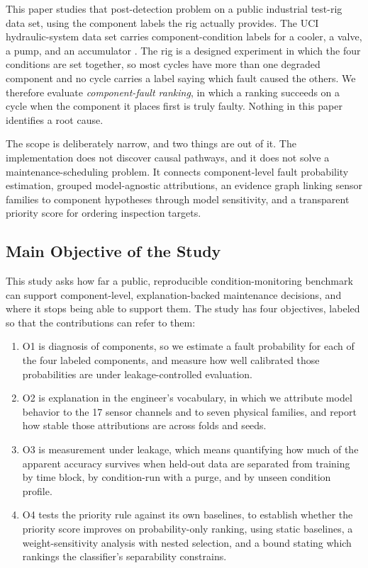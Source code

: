 \documentclass[journal]{IEEEtran}
\begin{document}
This paper studies that post-detection problem on a public industrial test-rig
data set, using the component labels the rig actually provides. The UCI
hydraulic-system data set carries component-condition labels for a cooler, a
valve, a pump, and an accumulator \cite{Helwig2015Hydraulic,Dua2019UCI}. The rig is
a designed experiment in which the four conditions are set together, so most
cycles have more than one degraded component and no cycle carries a label saying
which fault caused the others. We therefore evaluate \emph{component-fault
ranking}, in which a ranking succeeds on a cycle when the component it places first is
truly faulty. Nothing in this paper identifies a root cause.

The scope is deliberately narrow, and two things are out of it. The implementation
does not discover causal pathways, and it does not solve a maintenance-scheduling
problem. It connects component-level fault probability estimation, grouped
model-agnostic attributions, an evidence graph linking sensor families to component
hypotheses through model sensitivity, and a transparent priority score for ordering
inspection targets.

\subsection{Main Objective of the Study}
\label{sec:objective}

This study asks how far a public, reproducible condition-monitoring benchmark can
support component-level, explanation-backed maintenance decisions, and where it
stops being able to support them. The study has four objectives, labeled so that the
contributions can refer to them:
\begin{enumerate}
    \item O1 is diagnosis of components, so we estimate a fault probability for
    each of the four labeled components, and measure how well calibrated those
    probabilities are under leakage-controlled evaluation.
    \item O2 is explanation in the engineer's vocabulary, in which we attribute model behavior
    to the 17 sensor channels and to seven physical families, and report how stable
    those attributions are across folds and seeds.
    \item O3 is measurement under leakage, which means quantifying how much of the apparent accuracy
    survives when held-out data are separated from training by time block, by
    condition-run with a purge, and by unseen condition profile.
    \item O4 tests the priority rule against its own baselines, to establish
    whether the priority score improves on probability-only ranking, using static
    baselines, a weight-sensitivity analysis with nested selection, and a bound
    stating which rankings the classifier's separability constrains.
\end{enumerate}
\end{document}
